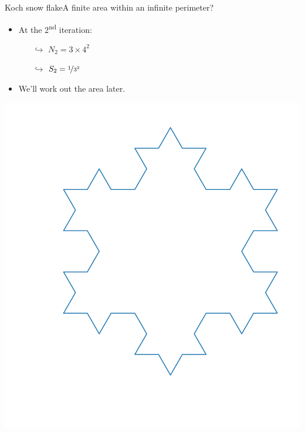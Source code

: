 \documentclass[usenames,dvipsnames,svgnames,10pt,aspectratio=169]{beamer}
\begin{document}
\begin{frame}[t, c]{Koch snow flake}{A finite area within an infinite perimeter?}
	\centering
	\begin{minipage}{.48\textwidth}
		\begin{itemize}
			\item At the 2\textsuperscript{nd} iteration:
			\begin{itemize}
				\item[$\hookrightarrow$] $N_2 = 3 \times 4^2$
				\item[$\hookrightarrow$] $S_2 = \nicefrac{1}{3^2}$
			\end{itemize}

			\bigskip

			\item We'll work out the area later.
		\end{itemize}
	\end{minipage}%
	\hfill
	\begin{minipage}{.48\textwidth}
		\centering
		\includegraphics[width=.8\textwidth]{koch_2_it}
	\end{minipage}

	\vspace{1cm}
\end{frame}
\end{document}
